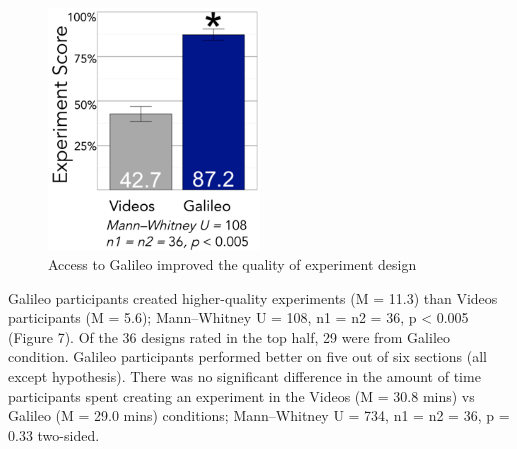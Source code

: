 \begin{figure}
  \includegraphics[width=0.5\textwidth]{figures/galileo/galileo-study1-7}
  \caption[Access to Galileo improved the quality of experiment design]
{Access to Galileo improved the quality of experiment design}
  \label{fig:galileo-result}
\end{figure}

Galileo participants created higher-quality experiments (M = 11.3) than Videos participants (M = 5.6); Mann–Whitney U = 108, n1 = n2 = 36, p < 0.005 (Figure 7). Of the 36 designs rated in the top half, 29 were from Galileo condition. Galileo participants performed better on five out of six sections (all except hypothesis). There was no significant difference in the amount of time participants spent creating an experiment in the Videos (M = 30.8 mins) vs Galileo (M = 29.0 mins) conditions; Mann–Whitney U = 734, n1 = n2 = 36, p = 0.33 two-sided. 


